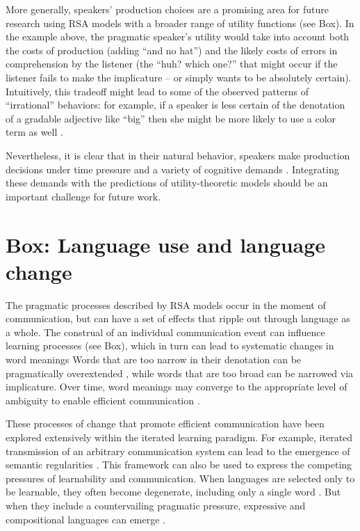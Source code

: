 \documentclass[]{elsarticle}
\begin{document}
More generally, speakers' production choices are a promising area for
future research using RSA models with a broader range of utility
functions (see Box). In the example above, the pragmatic speaker's
utility would take into account both the costs of production (adding
``and no hat'') and the likely costs of errors in comprehension by the
listener (the ``huh? which one?'' that might occur if the listener fails
to make the implicature -- or simply wants to be absolutely certain).
Intuitively, this tradeoff might lead to some of the observed patterns
of ``irrational'' behaviors: for example, if a speaker is less certain
of the denotation of a gradable adjective like ``big'' then she might be
more likely to use a color term as well \citep{gatt2013}.

Nevertheless, it is clear that in their natural behavior, speakers make
production decisions under time pressure and a variety of cognitive
demands \citep{levelt1993}. Integrating these demands with the predictions of
utility-theoretic models should be an important challenge for future
work.

\section{Box: Language use and language
change}\label{box-language-use-and-language-change}

The pragmatic processes described by RSA models occur in the moment of
communication, but can have a set of effects that ripple out through
language as a whole. The construal of an individual communication event
can influence learning processes (see Box), which in turn can lead to
systematic changes in word meanings \citep{smith2013}
Words that are too narrow in their denotation can be pragmatically
overextended \citep{kao2014}, while words that are too
broad can be narrowed via implicature. Over time, word meanings may
converge to the appropriate level of ambiguity to enable efficient
communication \citep{piantadosi2013}.

These processes of change that promote efficient communication have been
explored extensively within the iterated learning paradigm. For example,
iterated transmission of an arbitrary communication system can lead to
the emergence of semantic regularities \citep{kirby2008}.
This framework can also be used to express the competing pressures of
learnability and communication. When languages are selected only to be
learnable, they often become degenerate, including only a single word
\citep{perfors2014}. But when they include a countervailing
pragmatic pressure, expressive and compositional languages can emerge
\citep{kirby2015}.
\end{document}
